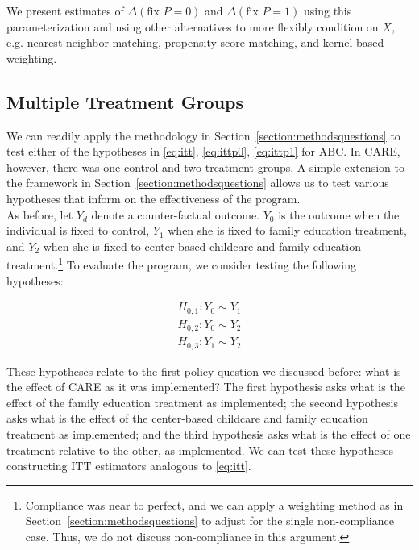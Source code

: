 \noindent We present estimates of $\Delta \left( \text{fix } P = 0 \right)$ and $\Delta \left( \text{fix } P = 1 \right)$ using this parameterization and using other alternatives to more flexibly  condition on $X$, e.g. nearest neighbor matching, propensity score matching, and kernel-based weighting.

\subsection{Multiple Treatment Groups}

\noindent We can readily apply the methodology in Section~\ref{section:methodsquestions}  to test either of the hypotheses in \eqref{eq:itt}, \eqref{eq:ittp0}, \eqref{eq:ittp1} for ABC. In CARE, however, there was one control and two treatment groups. A simple extension to the framework in Section~\ref{section:methodsquestions} allows us to test various hypotheses that inform on the effectiveness of the program.\\

\noindent As before, let $Y_{d}$ denote a counter-factual outcome. $Y_{0}$ is the outcome when the individual is fixed to control, $Y_{1}$ when she is fixed to family education treatment, and $Y_{2}$ when she is fixed to center-based childcare and family education treatment.\footnote{Compliance was near to perfect, and we can apply a weighting method as in Section~\ref{section:methodsquestions} to adjust for the single non-compliance case. Thus, we do not discuss non-compliance in this argument.} To evaluate the program, we consider testing the following hypotheses: 

\begin{eqnarray}
H_{0,1}: Y_{0} \sim Y_{1} \\ 
H_{0,2}: Y_{0} \sim Y_{2} \\
H_{0,3}: Y_{1} \sim Y_{2} 
\end{eqnarray}

\noindent These hypotheses relate to the first policy question we discussed before: what is the effect of CARE as it was implemented? The first hypothesis asks what is the effect of the family education treatment as implemented; the second hypothesis asks what is the effect of the center-based childcare and family education treatment as implemented; and the third hypothesis asks what is the effect of one treatment relative to the other, as implemented. We can test these hypotheses constructing ITT estimators analogous to \eqref{eq:itt}.\\ 

